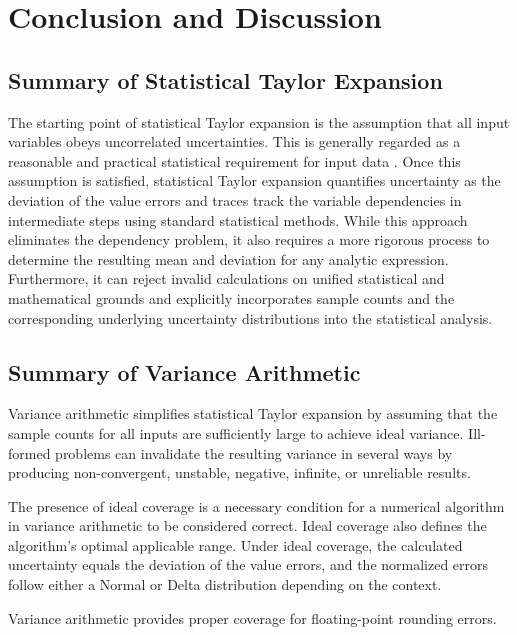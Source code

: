 \documentclass[twoside]{article}
\numberwithin{equation}{section}
\newcommand{\Verbose}{}
\begin{document}
\ifdefined\Verbose
\clearpage
\fi
\section{Conclusion and Discussion}
\label{sec: conclusion and discussion}

\subsection{Summary of Statistical Taylor Expansion}

The starting point of statistical Taylor expansion is the assumption that all input variables obeys uncorrelated uncertainties. 
This is generally regarded as a reasonable and practical statistical requirement for input data \cite{Prev_Precision_Arithmetic}.
Once this assumption is satisfied, statistical Taylor expansion quantifies uncertainty as the deviation of the value errors and traces  track the variable dependencies in intermediate steps using standard statistical methods.
While this approach eliminates the dependency problem, it also requires a more rigorous process to determine the resulting mean and deviation for any analytic expression.
Furthermore, it can reject invalid calculations on unified statistical and mathematical grounds and explicitly incorporates sample counts and the corresponding underlying uncertainty distributions into the statistical analysis.



\subsection{Summary of Variance Arithmetic}

Variance arithmetic simplifies statistical Taylor expansion by assuming that the sample counts for all inputs are sufficiently large to achieve ideal variance.
Ill-formed problems can invalidate the resulting variance in several ways by producing non-convergent, unstable, negative, infinite, or unreliable results.

The presence of ideal coverage is a necessary condition for a numerical algorithm in variance arithmetic to be considered correct. 
Ideal coverage also defines the algorithm’s optimal applicable range. 
Under ideal coverage, the calculated uncertainty equals the deviation of the value errors, and the normalized errors follow either a Normal or Delta distribution depending on the context.

Variance arithmetic provides proper coverage for floating-point rounding errors.
\end{document}
